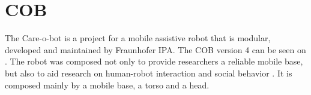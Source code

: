 


\section{COB}

The Care-o-bot is a project for a mobile assistive robot that is modular, developed and maintained by Fraunhofer IPA. The COB version 4 can be seen on . The robot was composed not only to provide researchers a reliable mobile base, but also to aid research on human-robot interaction and social behavior \cite{mci/Kittmann2015}. It is composed mainly by a mobile base, a torso and a head.

